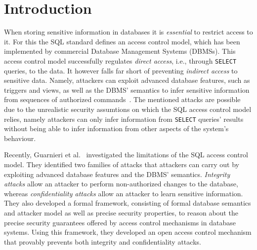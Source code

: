 \section{Introduction}
When storing sensitive information in databases it is \emph{essential} to restrict access to it. 
%
For this the SQL standard defines an access control model, which has been implemented by commercial Database Management Systems (DBMSs). 
%
This access control model successfully regulates \emph{direct access}, i.e., through \texttt{SELECT} queries, to the data. It however falls far short of preventing \emph{indirect access} to sensitive data.
%
Namely, attackers can exploit advanced database features, such as triggers and views, as well as the DBMS' semantics to infer sensitive information from sequences of authorized commands~\cite{guarnieri2016strong, ..., ..., ...}.
%
The mentioned attacks are possible due to the unrealistic security assumtions on which the SQL access control model relies, namely attackers can only infer information from \texttt{SELECT} queries' results without being able to infer information from other aspects of the system's behaviour.

Recently, Guarnieri et al.~\cite{guarnieri2016strong} investigated the limitations of the SQL access control model. They identified two families of attacks that attackers can carry out by exploiting advanced database features and the DBMS' semantics.
%
\emph{Integrity attacks} allow an attacker to perform non-authorized changes to the database, whereas \emph{confidentiality attacks} allow an attacker to learn sensitive information.
%
They also developed a formal framework, consisting of formal database semantics and attacker model as well as precise security properties, to reason about the precise security guarantees offered by access control mechanisms in database systems.
%
Using this framework, they developed an open access control mechanism that provably prevents both integrity and confidentiality attacks.



